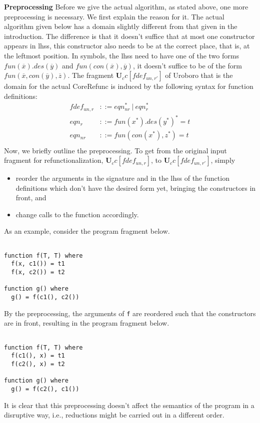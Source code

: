 \textbf{Preprocessing } Before we give the actual algorithm, as stated above, one more preprocessing is necessary. We first explain the reason for it. The actual algorithm given below has a domain slightly different from that given in the introduction. The difference is that it doesn't suffice that at most one constructor appears in lhss, this constructor also needs to be at the correct place, that is, at the leftmost position. In symbols, the lhss need to have one of the two forms $fun(\overline{x}).des(\overline{y})$ and $fun(con(\overline{x}), \overline{y})$, it doesn't suffice to be of the form $fun(\overline{x}, con(\overline{y}), \overline{z})$. The fragment $\mathbf{U}_cc[fdef_{un,r'}]$ of Uroboro that is the domain for the actual \textsf{CoreRefunc} is induced by the following syntax for function definitions:
\begin{align*}
fdef_{un,r} &::= eqn_{nr}^* ~ | ~ eqn_r^* \\
eqn_r &::= fun(x^*).des(y^*)^* = t \\
eqn_{nr} &::= fun(con(x^*), z^*) = t \\
\end{align*}
Now, we briefly outline the preprocessing. To get from the original input fragment for refunctionalization, $\mathbf{U}_cc[fdef_{un,r}]$, to $\mathbf{U}_cc[fdef_{un,r'}]$, simply
\begin{itemize}
\item reorder the arguments in the signature and in the lhss of the function definitions which don't have the desired form yet, bringing the constructors in front, and
\item change calls to the function accordingly.
\end{itemize}
As an example, consider the program fragment below.
\begin{lstlisting}

function f(T, T) where
  f(x, c1()) = t1
  f(x, c2()) = t2

function g() where
  g() = f(c1(), c2())

\end{lstlisting}
By the preprocessing, the arguments of \texttt{f} are reordered such that the constructors are in front, resulting in the program fragment below.
\begin{lstlisting}

function f(T, T) where
  f(c1(), x) = t1
  f(c2(), x) = t2

function g() where
  g() = f(c2(), c1())

\end{lstlisting}
It is clear that this preprocessing doesn't affect the semantics of the program in a disruptive way, i.e., reductions might be carried out in a different order.

